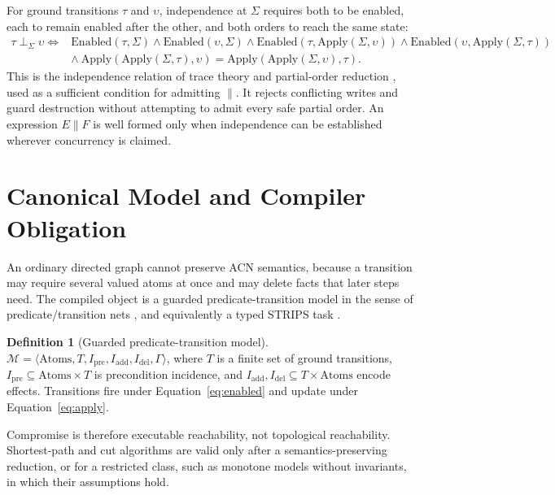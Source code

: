 \documentclass[11pt,letterpaper]{article}
\theoremstyle{definition}
\newtheorem{definition}{Definition}
\newcommand{\St}{\Sigma}
\newcommand{\Inv}{\Gamma}
\newcommand{\En}{\mathrm{Enabled}}
\newcommand{\Ap}{\mathrm{Apply}}
\newcommand{\Mod}{\mathcal{M}}
\begin{document}
For ground transitions $\tau$ and $\upsilon$, independence at $\St$ requires both to be enabled, each to remain enabled after the other, and both orders to reach the same state:
\begin{equation}\label{eq:indep}
\begin{aligned}
\tau\perp_{\St}\upsilon\iff{}& \En(\tau,\St)\wedge\En(\upsilon,\St)\wedge\En(\tau,\Ap(\St,\upsilon))\wedge\En(\upsilon,\Ap(\St,\tau))\\
&\wedge\ \Ap(\Ap(\St,\tau),\upsilon)=\Ap(\Ap(\St,\upsilon),\tau).
\end{aligned}
\end{equation}
This is the independence relation of trace theory and partial-order reduction \cite{mazurkiewicz1987,godefroid1996}, used as a sufficient condition for admitting $\parallel$. It rejects conflicting writes and guard destruction without attempting to admit every safe partial order. An expression $E\parallel F$ is well formed only when independence can be established wherever concurrency is claimed.

\section{Canonical Model and Compiler Obligation}\label{sec:model}

An ordinary directed graph cannot preserve ACN semantics, because a transition may require several valued atoms at once and may delete facts that later steps need. The compiled object is a guarded predicate-transition model in the sense of predicate/transition nets \cite{genrich1981}, and equivalently a typed STRIPS task \cite{strips}.

\begin{definition}[Guarded predicate-transition model]
$\Mod=\langle \mathrm{Atoms},T,I_{\mathrm{pre}},I_{\mathrm{add}},I_{\mathrm{del}},\Inv\rangle$, where $T$ is a finite set of ground transitions, $I_{\mathrm{pre}}\subseteq\mathrm{Atoms}\times T$ is precondition incidence, and $I_{\mathrm{add}},I_{\mathrm{del}}\subseteq T\times\mathrm{Atoms}$ encode effects. Transitions fire under Equation~\eqref{eq:enabled} and update under Equation~\eqref{eq:apply}.
\end{definition}
Compromise is therefore executable reachability, not topological reachability. Shortest-path and cut algorithms are valid only after a semantics-preserving reduction, or for a restricted class, such as monotone models without invariants, in which their assumptions hold.
\end{document}

